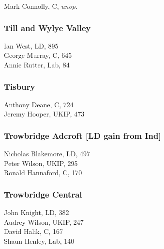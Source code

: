 \documentclass[a4paper,openany,10pt]{book}
\begin{document}


Mark Connolly, C, \emph{unop.}\\


\subsubsection*{Till and Wylye Valley}



Ian West, LD, 895\\
George Murray, C, 645\\
Annie Rutter, Lab, 84\\


\subsubsection*{Tisbury}



Anthony Deane, C, 724\\
Jeremy Hooper, UKIP, 473\\


\subsubsection*{Trowbridge Adcroft \hspace*{\fill}\nolinebreak[1]%
\enspace\hspace*{\fill}
[LD gain from Ind]}



Nicholas Blakemore, LD, 497\\
Peter Wilson, UKIP, 295\\
Ronald Hannaford, C, 170\\


\subsubsection*{Trowbridge Central}



John Knight, LD, 382\\
Audrey Wilson, UKIP, 247\\
David Halik, C, 167\\
Shaun Henley, Lab, 140\\
\end{document}
